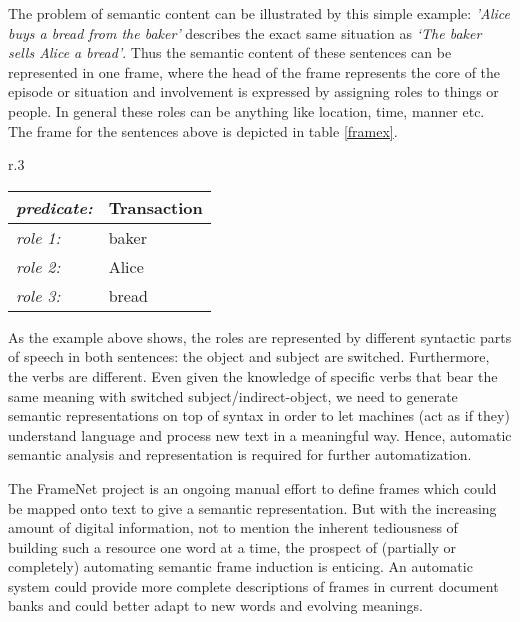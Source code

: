 \documentclass{article} %
\begin{document}
The problem of semantic content can be illustrated by this simple example: \textit{'Alice buys a bread from the baker'} describes the exact same situation as \textit{`The baker sells Alice a bread'}. Thus the semantic content of these sentences can be represented in one frame, where the head of the frame represents the core of the episode or situation and involvement is expressed by assigning roles to things or people. In general these roles can be anything like location, time, manner etc. The frame for the sentences above is depicted in table \ref{framex}.
\begin{wraptable}{r}{.3\textwidth}
  \centering
\begin{tabular}{|l l|}
  \hline
  \textit{\small predicate:\normalsize}&Transaction\\
  \hline
  \hline
  \textit{\small role 1:\normalsize} &baker\\
  \textit{\small role 2:\normalsize} &Alice\\
  \textit{\small role 3:\normalsize} &bread\\
  \hline
\end{tabular}
\caption{Simple frame}
\label{framex}
\end{wraptable}
As the example above shows, the roles are represented by different syntactic parts of speech in both sentences: the object and subject are switched. Furthermore, the verbs are different. Even given the knowledge of specific verbs that bear the same meaning with switched subject/indirect-object, we need to generate semantic representations on top of syntax in order to let machines (act as if they) understand language and process new text in a meaningful way. Hence, automatic semantic analysis and representation is required for further automatization.

The FrameNet project \citep{framenet} is an ongoing manual effort to define frames which could be mapped onto text to give a semantic representation. But with the increasing amount of digital information, not to mention the inherent tediousness of building such a resource one word at a time, the prospect of (partially or completely) automating semantic frame induction is enticing. An automatic system could provide more complete descriptions of frames in current document banks and could better adapt to new words and evolving meanings.
\end{document}
